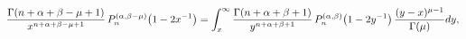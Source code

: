 \[\frac{\mathop{\Gamma\/}\nolimits\!\left(n+\alpha+\beta-\mu+1\right)}{x^{n+%
\alpha+\beta-\mu+1}}\mathop{P^{(\alpha,\beta-\mu)}_{n}\/}\nolimits\!\left(1-2x%
^{-1}\right)=\int_{x}^{\infty}\frac{\mathop{\Gamma\/}\nolimits\!\left(n+\alpha%
+\beta+1\right)}{y^{n+\alpha+\beta+1}}\mathop{P^{(\alpha,\beta)}_{n}\/}%
\nolimits\!\left(1-2y^{-1}\right)\*\frac{(y-x)^{\mu-1}}{\mathop{\Gamma\/}%
\nolimits\!\left(\mu\right)}dy,\]